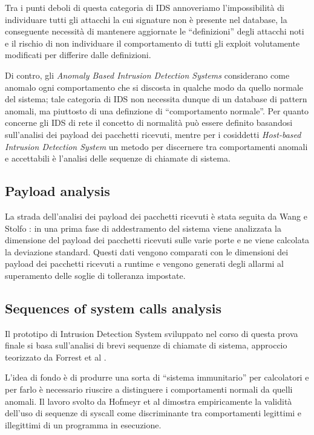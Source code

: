 \documentclass[11pt]{article}
\begin{document}
Tra i punti deboli di questa categoria di IDS annoveriamo l'impossibilità di
individuare tutti gli attacchi la cui signature non è presente nel database, la
conseguente necessità di mantenere aggiornate le ``definizioni'' degli attacchi
noti e il rischio di non individuare il comportamento di tutti gli exploit
volutamente modificati per differire dalle definizioni.

Di contro, gli \emph{Anomaly Based Intrusion Detection Systems} considerano
come anomalo ogni comportamento che si discosta in qualche modo da quello
normale del sistema; tale categoria di IDS non necessita dunque di un database
di pattern anomali, ma piuttosto di una definzione di ``comportamento
normale''. Per quanto concerne gli IDS di rete il concetto di normalità può
essere definito basandosi sull'analisi dei payload dei pacchetti ricevuti,
mentre per i cosiddetti \emph{Host-based Intrusion Detection System} un metodo
per discernere tra comportamenti anomali e accettabili è l'analisi delle
sequenze di chiamate di sistema.

\subsection{Payload analysis}
La strada dell'analisi dei payload dei pacchetti ricevuti è stata seguita da
Wang e Stolfo \cite{wang}: in una prima fase di addestramento del sistema viene
analizzata la dimensione del payload dei pacchetti ricevuti sulle varie porte e
ne viene calcolata la deviazione standard. Questi dati vengono comparati con le
dimensioni dei payload dei pacchetti ricevuti a runtime e vengono generati
degli allarmi al superamento delle soglie di tolleranza impostate.

\subsection{Sequences of system calls analysis}
\label{ids:syscall}
Il prototipo di Intrusion Detection System sviluppato nel corso di questa prova
finale si basa sull'analisi di brevi sequenze di chiamate di sistema, approccio
teorizzato da Forrest et al \cite{forrest96}.

L'idea di fondo è di produrre una sorta di ``sistema immunitario'' per
calcolatori e per farlo è necessario riuscire a distinguere i comportamenti
normali da quelli anomali. Il lavoro svolto da Hofmeyr et al \cite{hofmeyr97}
dimostra empiricamente la validità dell'uso di sequenze di syscall come
discriminante tra comportamenti legittimi e illegittimi di un programma in
esecuzione.
\end{document}
